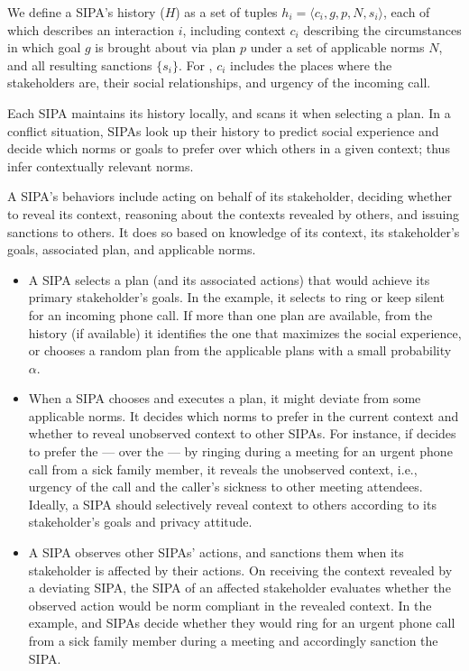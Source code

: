 We define a SIPA's history ($H$) as a set of tuples $h_i = \langle c_i, g, p, N, s_i \rangle$, each of which describes an interaction $i$, including context $c_i$ describing the circumstances in which goal $g$ is brought about via plan $p$ under a set of applicable norms $N$, and all resulting sanctions $\{s_i\}$. 
%
For \ringer, $c_i$ includes the places where the stakeholders are, their social relationships, and urgency of the incoming call.

Each SIPA maintains its history locally, and scans it when selecting a plan. In a conflict situation, SIPAs look up their history to predict social experience and decide which norms or goals to prefer over which others in a given context; thus infer contextually relevant norms.

A SIPA's behaviors include acting on behalf of its stakeholder, deciding whether to reveal its context, reasoning about the contexts revealed by others, and issuing sanctions to others. It does so based on knowledge of its context, its stakeholder's goals, associated plan, and applicable norms.

\begin{itemize}
    \item {} A SIPA selects a plan (and its associated actions) that would achieve its primary stakeholder's goals. In the \ringer example, it selects to ring or keep silent for an incoming phone call. If more than one plan are available, from the history (if available) it identifies the one that maximizes the social experience, or chooses a random plan from the applicable plans with a small probability $\alpha$.  
    
    \item {} When a SIPA chooses and executes a plan, it might deviate from some applicable norms. It decides which norms to prefer in the current context and whether to reveal unobserved context to other SIPAs. For instance, if \ringer decides to prefer the --- over the --- by ringing during a meeting for an urgent phone call from a sick family member, it reveals the unobserved context, i.e., urgency of the call and the caller's sickness to other meeting attendees. Ideally, a SIPA should selectively reveal context to others according to its stakeholder's goals and privacy attitude. 
    
    \item {} A SIPA observes other SIPAs' actions, and sanctions them when its stakeholder is affected by their actions. On receiving the context revealed by a deviating SIPA, the SIPA of an affected stakeholder evaluates whether the observed action would be norm compliant in the revealed context. In the \ringer example,  and  SIPAs decide whether they would ring for an urgent phone call from a sick family member during a meeting and accordingly sanction the  SIPA. 
\end{itemize}

